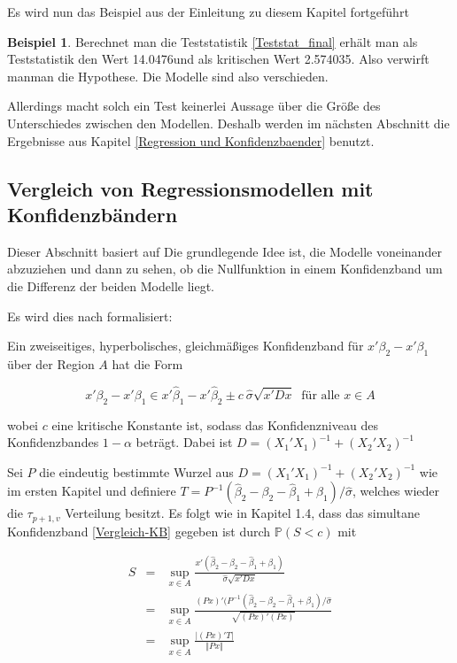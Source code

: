 \documentclass[12pt,a4paper]{article}
\theoremstyle{definition}
\newtheorem{Beispiel}[Definition]{Beispiel}
\theoremstyle{definition}
\theoremstyle{definition}
\theoremstyle{definition}
\newcommand{\TestWert}{14.0476}%
\newcommand{\kritWert}{2.574035}%
\newcommand{\EntscheidungHypothesen}{verwirft man}
\newcommand{\Modellesind}{verschieden}
\begin{document}
Es wird nun das Beispiel aus der Einleitung zu diesem Kapitel fortgeführt

\begin{Beispiel}
Berechnet man die Teststatistik \eqref{Teststat_final} erhält man als Teststatistik den Wert \TestWert und als kritischen Wert \kritWert . Also \EntscheidungHypothesen man die Hypothese. Die Modelle sind also \Modellesind .
\end{Beispiel}

Allerdings macht solch ein Test keinerlei Aussage über die Größe des Unterschiedes zwischen den Modellen. Deshalb werden im nächsten Abschnitt die Ergebnisse aus Kapitel \ref{Regression und Konfidenzbaender} benutzt.


\subsection{Vergleich von Regressionsmodellen mit Konfidenzbändern}
\label{Konfidenzbaender vergleich}
Dieser Abschnitt basiert auf \cite[119-121]{Liu64}
Die grundlegende Idee ist, die Modelle voneinander abzuziehen und dann zu sehen, ob die Nullfunktion in einem Konfidenzband um die Differenz der beiden Modelle liegt.

Es wird dies nach \cite[122]{Liu64} formalisiert: 

Ein zweiseitiges, hyperbolisches, gleichmäßiges Konfidenzband für $x'\beta_2 - x'\beta_1$ über der Region $A$ hat die Form

\begin{equation} \label{Vergleich-KB}
x'\beta_2-x'\beta_1 \in x' \hat{\beta}_1 - x' \hat{\beta}_2 \pm c ~ \hat{\sigma} \sqrt{x' D x} ~ \text{ für alle } x \in A
\end{equation}

wobei $c$ eine kritische Konstante ist, sodass das Konfidenzniveau des Konfidenzbandes $1-\alpha$ beträgt. Dabei ist $D = (X_1'X_1)^{-1} + (X_2'X_2)^{-1}$

Sei $P$ die eindeutig bestimmte Wurzel aus $D = (X_1'X_1)^{-1} + (X_2'X_2)^{-1}$ wie im ersten Kapitel und definiere $T=P^{-1}(\hat{\beta}_2 - \beta_2 - \hat{\beta}_1 + \beta_1)/\hat{\sigma}$, welches wieder die $\tau_{p+1,v}$ Verteilung besitzt. Es folgt wie in Kapitel 1.4, dass das simultane Konfidenzband \eqref{Vergleich-KB} gegeben ist durch $\mathbb{P}(S<c)$ mit

\begin{eqnarray*}
S &=& \sup_{x \in A} \frac{x' (\hat{\beta}_2-\beta_2-\hat{\beta}_1+\beta_1)}{\hat{\sigma}\sqrt{x' D x}}\\
&=& \sup_{x \in A} \frac{(Px)' (P^{-1} (\hat{\beta}_2-\beta_2-\hat{\beta}_1+\beta_1)/\hat{\sigma}}{\sqrt{(Px)'(Px)}} \\
&=& \sup_{x \in A} \frac{\vert (Px)' T \vert}{\Vert Px \Vert}
\end{eqnarray*}
\end{document}
